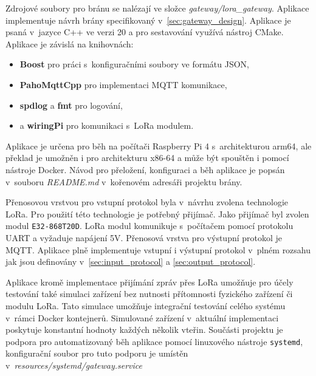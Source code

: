 Zdrojové soubory pro bránu se nalézají ve složce \textit{gateway/lora\_gateway}. Aplikace implementuje návrh brány specifikovaný v~\ref{sec:gateway_design}. Aplikace je psaná v~jazyce C++ ve verzi 20 a pro sestavování využívá nástroj CMake. Aplikace je závislá na knihovnách:
\begin{itemize}
    \item \textbf{Boost} pro práci s~konfiguračními soubory ve formátu JSON,
    \item \textbf{PahoMqttCpp} pro implementaci MQTT komunikace,
    \item \textbf{spdlog} a \textbf{fmt} pro logování,
    \item a \textbf{wiringPi} pro komunikaci s~LoRa modulem.
\end{itemize}
Aplikace je určena pro běh na počítači Raspberry Pi 4 s~architekturou arm64, ale překlad je umožněn i pro architekturu x86-64 a může být spouštěn i pomocí nástroje Docker. Návod pro přeložení, konfiguraci a běh aplikace je popsán v~souboru \textit{README.md} v~kořenovém adresáři projektu brány.

Přenosovou vrstvou pro vstupní protokol byla v~návrhu zvolena technologie LoRa. Pro použití této technologie je potřebný přijímač. Jako přijímač byl zvolen modul \texttt{E32-868T20D}. LoRa modul komunikuje s~počítačem pomocí protokolu UART a vyžaduje napájení 5V. Přenosová vrstva pro výstupní protokol je MQTT. Aplikace plně implementuje vstupní i výstupní protokol v~plném rozsahu jak jsou definovány v~\ref{sec:input_protocol} a \ref{sec:output_protocol}.

Aplikace kromě implementace přijímání zpráv přes LoRa umožňuje pro účely testování také simulaci zařízení bez nutnosti přítomnosti fyzického zařízení či modulu LoRa. Tato simulace umožňuje integrační testování celého systému v~rámci Docker kontejnerů. Simulované zařízení v~aktuální implementaci poskytuje konstantní hodnoty každých několik vteřin. Součásti projektu je podpora pro automatizovaný běh aplikace pomocí linuxového nástroje \texttt{systemd}, konfigurační soubor pro tuto podporu je umístěn v~\textit{resources/systemd/gateway.service}

